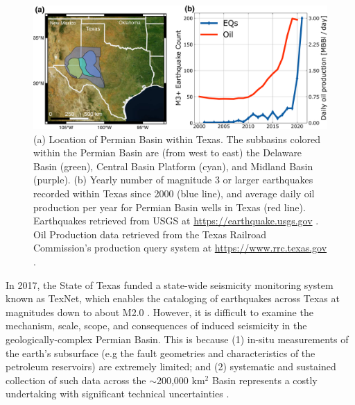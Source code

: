 \begin{figure}
	\centering
	\includegraphics[width=\columnwidth]{figures/permian-overview-eqs-oil.pdf}
	\caption[Permian Basin oil production and earthquakes]{
		(a) Location of Permian Basin within Texas. The subbasins colored within the Permian Basin are (from west to east) the Delaware Basin (green), Central Basin Platform (cyan), and Midland Basin (purple).
		(b) Yearly number of magnitude 3 or larger earthquakes recorded within Texas since 2000 (blue line), and average daily oil production per year for Permian Basin wells in Texas (red line).
		Earthquakes retrieved from USGS at \url{https://earthquake.usgs.gov} . Oil Production data retrieved from the Texas Railroad Commission's production query system at \url{https://www.rrc.texas.gov} .
	}
	\label{fig:permian-overview}
\end{figure}





In 2017, the State of Texas funded a state-wide seismicity monitoring system known as TexNet, which enables the cataloging of earthquakes across Texas at magnitudes down to about M2.0 \citep{Savvaidis2019TexnetStatewideSeismological}. However, it is difficult to examine the mechanism, scale, scope, and consequences of induced seismicity in the geologically-complex Permian Basin. This is because (1) in-situ measurements of the earth's subsurface (e.g the fault geometries and characteristics of the petroleum reservoirs) are extremely limited; and (2) systematic and sustained collection of such data across the $\sim$200,000 km$^2$ Basin represents a costly undertaking with significant technical uncertainties \citep{Hennings2021StabilityFaultSystems}.


